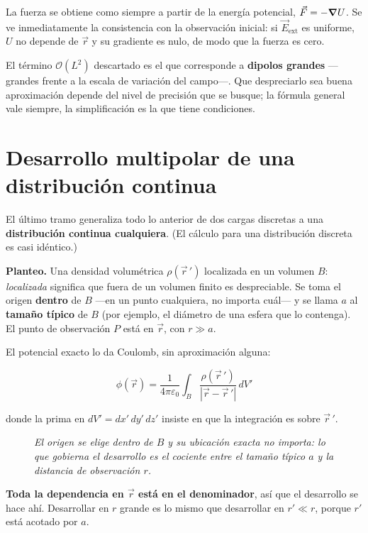 \documentclass[12pt,a4paper]{article}
\begin{document}
La fuerza se obtiene como siempre a partir de la energía potencial,
$\vec F = -\grad U$. Se ve inmediatamente la consistencia con la observación
inicial: si $\vec E_{\text{ext}}$ es uniforme, $U$ no depende de $\vec r$ y su
gradiente es nulo, de modo que la fuerza es cero.

El término $\mathcal{O}(L^2)$ descartado es el que corresponde a \textbf{dipolos
grandes} ---grandes frente a la escala de variación del campo---. Que despreciarlo
sea buena aproximación depende del nivel de precisión que se busque; la fórmula
general vale siempre, la simplificación es la que tiene condiciones.

\section{Desarrollo multipolar de una distribución continua}

El último tramo generaliza todo lo anterior de dos cargas discretas a una
\textbf{distribución continua cualquiera}. (El cálculo para una distribución
discreta es casi idéntico.)

\textbf{Planteo.} Una densidad volumétrica $\rho(\vec r\,')$ localizada en un
volumen $B$: \emph{localizada} significa que fuera de un volumen finito es
despreciable. Se toma el origen \textbf{dentro} de $B$ ---en un punto cualquiera,
no importa cuál--- y se llama $a$ al \textbf{tamaño típico} de $B$ (por ejemplo,
el diámetro de una esfera que lo contenga). El punto de observación $P$ está en
$\vec r$, con $r \gg a$.

El potencial exacto lo da Coulomb, sin aproximación alguna:

\[
\phi(\vec r) = \frac{1}{4\pi\varepsilon_0}\int_B \frac{\rho(\vec r\,')}{|\vec r - \vec r\,'|}\,dV'
\]

donde la prima en $dV' = dx'\,dy'\,dz'$ insiste en que la integración es sobre
$\vec r\,'$.

\begin{figure}[H]
  \centering
  
  \caption*{\small\itshape El origen se elige \emph{dentro} de $B$ y su ubicación
  exacta no importa: lo que gobierna el desarrollo es el cociente entre el tamaño
  típico $a$ y la distancia de observación $r$.}
\end{figure}

\textbf{Toda la dependencia en $\vec r$ está en el denominador}, así que el
desarrollo se hace ahí. Desarrollar en $r$ grande es lo mismo que desarrollar en
$r' \ll r$, porque $r'$ está acotado por $a$.
\end{document}
